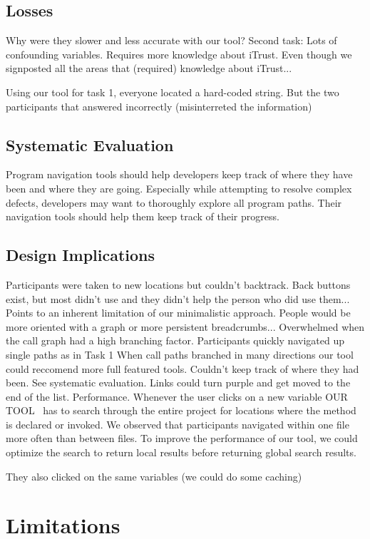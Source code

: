 \documentclass[conference]{IEEEtran}
\newcommand{\toolName}{OUR TOOL}
\begin{document}
\subsection{Losses}
Why were they slower and less accurate with our tool?
Second task: 
Lots of confounding variables.
Requires more knowledge about iTrust. Even though we signposted all the areas that (required) knowledge about iTrust...

Using our tool for task 1, everyone located a hard-coded string. But the two participants that answered incorrectly (misinterreted the information)

\subsection{Systematic Evaluation}
Program navigation tools should help developers keep track of where they have been and where they are going. Especially while attempting to resolve complex defects, developers may want to thoroughly explore all program paths. Their navigation tools should help them keep track of their progress.

\subsection{Design Implications}

Participants were taken to new locations but couldn't backtrack.
	Back buttons exist, but most didn't use and they didn't help the person who did use them...
	Points to an inherent limitation of our minimalistic approach. People would be more oriented with a graph or more persistent breadcrumbs...
Overwhelmed when the call graph had a high branching factor.
	Participants quickly navigated up single paths as in Task 1
	When call paths branched in many directions our tool could reccomend more full featured tools.
Couldn't keep track of where they had been.
	See systematic evaluation. Links could turn purple and get moved to the end of the list.
Performance.
	Whenever the user clicks on a new variable \toolName~ has to search through the entire project for locations where the method is declared or invoked. We observed that participants navigated within one file more often than between files. To improve the performance of our tool, we could optimize the search to return local results before returning global search results.
	
	They also clicked on the same variables (we could do some caching)


\section{Limitations}
\end{document}
